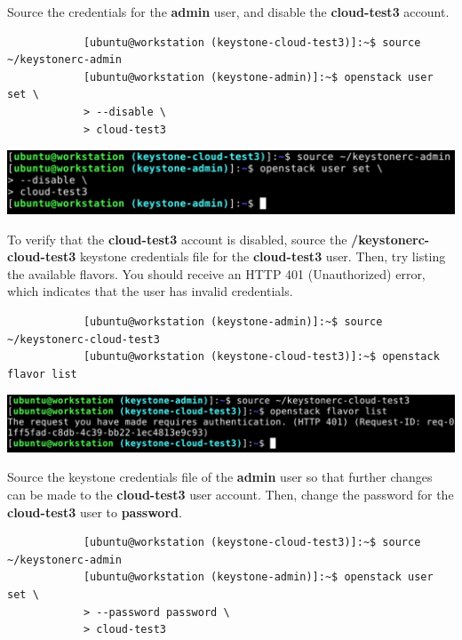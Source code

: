 \documentclass[letterpaper, 12pt]{article}
\begin{document}
\begin{enumerate}
    \begin{labstep}
        Source the credentials for the \textbf{admin} user, and disable the \textbf{cloud-test3} account.
        \begin{lstlisting}
            [ubuntu@workstation (keystone-cloud-test3)]:~$ source ~/keystonerc-admin
            [ubuntu@workstation (keystone-admin)]:~$ openstack user set \
            > --disable \
            > cloud-test3
        \end{lstlisting}

        \begin{center}
            \includegraphics[width=\linewidth]{images/part4/step15.png}
        \end{center}
    \end{labstep}

    \begin{labstep}
        To verify that the \textbf{cloud-test3} account is disabled, source the
        \textbf{\texttildemid/keystonerc-cloud-test3} keystone credentials file for the \textbf{cloud-test3} user.
        Then, try listing the available flavors.
        You should receive an HTTP 401 (Unauthorized) error, which indicates that the user has invalid credentials.
        \begin{lstlisting}
            [ubuntu@workstation (keystone-admin)]:~$ source ~/keystonerc-cloud-test3
            [ubuntu@workstation (keystone-cloud-test3)]:~$ openstack flavor list
        \end{lstlisting}

        \begin{center}
            \includegraphics[width=\linewidth]{images/part4/step16.png}
        \end{center}
    \end{labstep}

    \begin{labstep}
        Source the keystone credentials file of the \textbf{admin} user so that further changes can be made to the \textbf{cloud-test3} user account.
        Then, change the password for the \textbf{cloud-test3} user to \textbf{password}.
        \begin{lstlisting}
            [ubuntu@workstation (keystone-cloud-test3)]:~$ source ~/keystonerc-admin
            [ubuntu@workstation (keystone-admin)]:~$ openstack user set \
            > --password password \
            > cloud-test3
        \end{lstlisting}


\end{labstep}
\end{enumerate}
\end{document}
